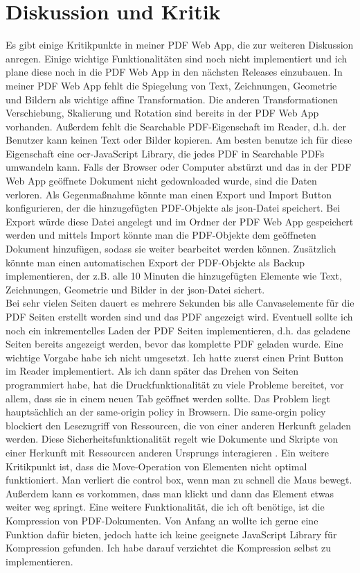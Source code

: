 \chapter*{Diskussion und Kritik}
Es gibt einige Kritikpunkte in meiner PDF Web App, die zur weiteren Diskussion anregen. Einige wichtige Funktionalitäten sind noch nicht implementiert und ich plane diese noch in die PDF Web App in den nächsten Releases einzubauen. In meiner PDF Web App fehlt die Spiegelung von Text, Zeichnungen, Geometrie und Bildern als wichtige affine Transformation. Die anderen Transformationen Verschiebung, Skalierung und Rotation sind bereits in der PDF Web App vorhanden. Außerdem fehlt die Searchable PDF-Eigenschaft im Reader, d.h. der Benutzer kann keinen Text oder Bilder kopieren. Am besten benutze ich für diese Eigenschaft eine \gls{ocr}-JavaScript Library, die jedes PDF in Searchable PDFs umwandeln kann. Falls der Browser oder Computer abstürzt und das in der PDF Web App geöffnete Dokument nicht gedownloaded wurde, sind die Daten verloren. Als Gegenmaßnahme könnte man einen Export und Import Button konfigurieren, der die hinzugefügten PDF-Objekte als \gls{json}-Datei speichert. Bei Export würde diese Datei angelegt und im Ordner der PDF Web App gespeichert werden und mittels Import könnte man die PDF-Objekte dem geöffneten Dokument hinzufügen, sodass sie weiter bearbeitet werden können. Zusätzlich könnte man einen automatischen Export der PDF-Objekte als Backup implementieren, der z.B. alle 10 Minuten die hinzugefügten Elemente wie Text, Zeichnungen, Geometrie und Bilder in der \gls{json}-Datei sichert. \\
Bei sehr vielen Seiten dauert es mehrere Sekunden bis alle Canvaselemente für die PDF Seiten erstellt worden sind und das PDF angezeigt wird. Eventuell sollte ich noch ein inkrementelles Laden der PDF Seiten implementieren, d.h. das geladene Seiten bereits angezeigt werden, bevor das komplette PDF geladen wurde. Eine wichtige Vorgabe habe ich nicht umgesetzt. Ich hatte zuerst einen Print Button im Reader implementiert. Als ich dann später das Drehen von Seiten programmiert habe, hat die Druckfunktionalität zu viele Probleme bereitet, vor allem, dass sie in einem neuen Tab geöffnet werden sollte. Das Problem liegt hauptsächlich an der same-origin policy in Browsern. Die same-orgin policy blockiert den Lesezugriff von Ressourcen, die von einer anderen Herkunft geladen werden. Diese Sicherheitsfunktionalität regelt wie Dokumente und Skripte von einer Herkunft mit Ressourcen anderen Ursprungs interagieren \cite{same-origin}. Ein weitere Kritikpunkt ist, dass die Move-Operation von Elementen nicht optimal funktioniert. Man verliert die control box, wenn man zu schnell die Maus bewegt. Außerdem kann es vorkommen, dass man klickt und dann das Element etwas weiter weg springt. Eine weitere Funktionalität, die ich oft benötige, ist die Kompression von PDF-Dokumenten. Von Anfang an wollte ich gerne eine Funktion dafür bieten, jedoch hatte ich keine geeignete JavaScript Library für Kompression gefunden. Ich habe darauf verzichtet die Kompression selbst zu implementieren. \\
